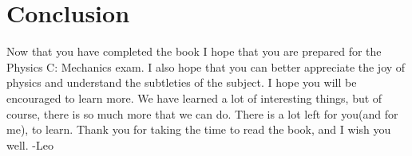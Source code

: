 \documentclass{article}[gray]
\numberwithin{equation}{subsection}
\begin{document}
\section{Conclusion}
Now that you have completed the book I hope that you are prepared for the Physics C: Mechanics exam. I also hope that you can better appreciate the joy of physics and understand the subtleties of the subject. I hope you will be encouraged to learn more. We have learned a lot of interesting things, but of course, there is so much more that we can do. There is a lot left for you(and for me), to learn. Thank you for taking the time to read the book, and I wish you well.
\newline
-Leo
\end{document}

